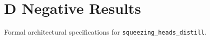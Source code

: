 \section{D Negative Results}

Formal architectural specifications for \texttt{squeezing_heads_distill}.
